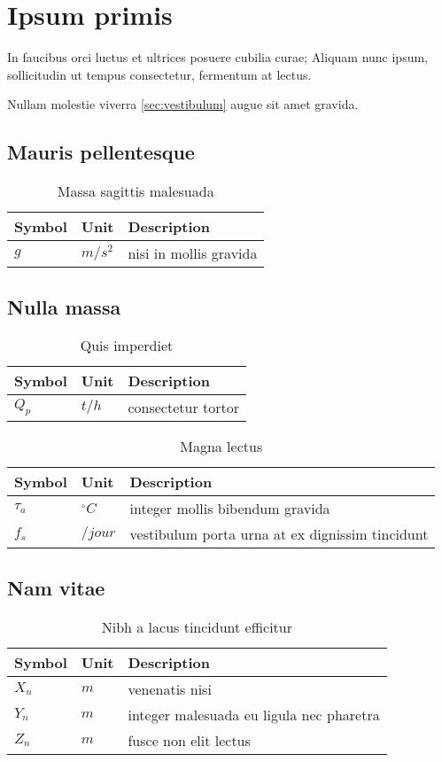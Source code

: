 \section{Ipsum primis}

In faucibus orci luctus et ultrices posuere cubilia curae; Aliquam nunc ipsum,
sollicitudin ut tempus consectetur, fermentum at lectus.

Nullam molestie viverra \ref{sec:vestibulum} augue sit amet gravida.

\newenvironment{nomenclature}[1]
{
  \begin{table}[hbt]
    \caption{#1}
    \begin{center}
      \begin{tabular}{|l|l|l|}
        \hline
        \textbf{Symbol} & \textbf{Unit} & \textbf{Description} \\
        \hline
        }
        {
        \\\hline
      \end{tabular}
    \end{center}
  \end{table}
}

\subsection{Mauris pellentesque}

\begin{nomenclature}{Massa sagittis malesuada}
  $g$     & $m/s^{2}$ & nisi in mollis gravida
\end{nomenclature}

\subsection{Nulla massa}

\begin{nomenclature}{Quis imperdiet}
  $Q_{p}$         & $t/h$             & consectetur tortor
\end{nomenclature}

\begin{nomenclature}{Magna lectus}
  $\tau_{a}$    	& $^{\circ}C$       & integer mollis bibendum gravida\\
  $f_{s}$     	& $/jour$           & vestibulum porta urna at ex dignissim tincidunt
\end{nomenclature}

\subsection{Nam vitae}

\begin{nomenclature}{Nibh a lacus tincidunt efficitur}
  $X_n$   & $m$               & venenatis nisi\\
  $Y_n$   & $m$               & integer malesuada eu ligula nec pharetra\\
  $Z_n$   & $m$               & fusce non elit lectus
\end{nomenclature}
